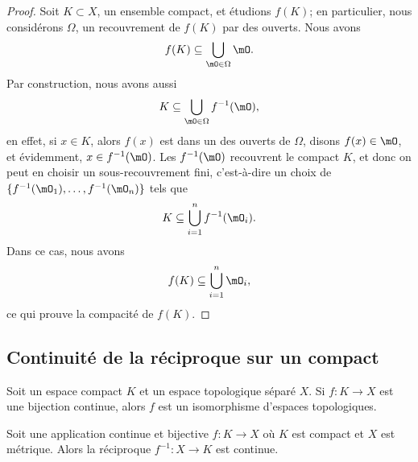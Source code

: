 \begin{proof}
	Soit \( K\subset X\), un ensemble compact, et étudions \( f(K)\); en particulier, nous considérons \( \Omega\), un recouvrement de \( f(K)\) par des ouverts. Nous avons
	\begin{equation}
		f(K)\subseteq\bigcup_{\mO\in\Omega}\mO.
	\end{equation}
	Par construction, nous avons aussi
	\begin{equation}
		K\subseteq\bigcup_{\mO\in\Omega}f^{-1}(\mO),
	\end{equation}
	en effet, si \( x\in K\), alors \( f(x)\) est dans un des ouverts de \( \Omega\), disons \( f(x)\in \mO\), et évidemment, \( x\in f^{-1}(\mO)\).  Les \( f^{-1}(\mO)\) recouvrent le compact \( K\), et donc on peut en choisir un sous-recouvrement fini, c'est-à-dire un choix de \( \{ f^{-1}(\mO_1),\ldots,f^{-1}(\mO_n) \}\) tels que
	\begin{equation}
		K\subseteq \bigcup_{i=1}^nf^{-1}(\mO_i).
	\end{equation}
	Dans ce cas, nous avons
	\begin{equation}
		f(K)\subseteq\bigcup_{i=1}^n\mO_i,
	\end{equation}
	ce qui prouve la compacité de \( f(K)\).
\end{proof}

\subsection{Continuité de la réciproque sur un compact}

\begin{lemma}       \label{LEMooNEEVooSeHYzx}
	Soit un espace compact \( K\) et un espace topologique séparé \( X\). Si \( f\colon K\to X\) est une bijection continue, alors \( f\) est un isomorphisme d'espaces topologiques.
\end{lemma}

\begin{lemma}     \label{LEMooPLGTooATIGov}
	Soit une application continue et bijective \( f\colon K\to X \) où \( K\) est compact et \( X\) est métrique. Alors la réciproque \(f^{-1}\colon X\to K\) est continue.
\end{lemma}

